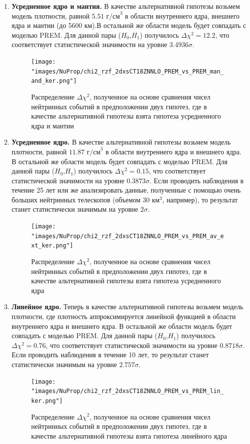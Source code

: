 \begin{enumerate}
    \item \textbf{Усредненное ядро и мантия.} В качестве альтернативной гипотезы возьмем модель плотности, равной $5.51\text{ г/см}^3$ в области внутреннего ядра, внешнего ядра и мантии (до 5600 км).В остальной же области модель будет совпадать с моделью PREM. Для данной пары ($H_0$,$H_1$) получилось $\Delta\chi^2 = 12.2$, что соответствует статистической значимости на уровне $3.4936\sigma$.   
    \begin{figure}[!h]
    \centering
    \texttt{[image: "images/NuProp/chi2\_rzf\_2dxsCT18ZNNLO\_PREM\_vs\_PREM\_man\_and\_ker.png"]}
    \caption{Распределение $\Delta\chi^2$, полученное на основе сравнения чисел нейтринных событий в предположении двух гипотез, где в качестве альтернативной гипотезы взята гипотеза усредненного ядра и мантии}
    \label{NuTom1}
    \end{figure}
    \item \textbf{Усредненное ядро.} В качестве альтернативной гипотезы возьмем модель плотности, равной $11.87\text{ г/см}^3$ в области внутреннего ядра и внешнего ядра. В остальной же области модель будет совпадать с моделью PREM. Для данной пары ($H_0$,$H_1$) получилось $\Delta\chi^2 = 0.15$, что соответствует статистической значимости на уровне $0.3873\sigma$. Если проводить наблюдения в течение 25 лет или же анализировать данные, полученные с помощью очень больших нейтринных телескопов (объемом $30 \text{ км}^3$, например), то результат станет статистически значимым на уровне $2\sigma$.   
    \begin{figure}[!h]
    \centering
    \texttt{[image: "images/NuProp/chi2\_rzf\_2dxsCT18ZNNLO\_PREM\_vs\_PREM\_av\_ext\_ker.png"]}
    \caption{Распределение $\Delta\chi^2$, полученное на основе сравнения чисел нейтринных событий в предположении двух гипотез, где в качестве альтернативной гипотезы взята гипотеза усредненного ядра}
    \label{NuTom2}
    \end{figure}
    \item \textbf{Линейное ядро.} Теперь в качестве альтернативной гипотезы возьмем модель плотности,  где плотность аппроксимируется линейной функцией в области внутреннего ядра и внешнего ядра. В остальной же области модель будет совпадать с моделью PREM. Для данной пары ($H_0$,$H_1$) получилось $\Delta\chi^2 = 0.76$, что соответствует статистической значимости на уровне $0.8718\sigma$. Если проводить наблюдения в течение 10 лет, то результат станет статистически значимым на уровне $2.757\sigma$. 
    \begin{figure}[!h]
    \centering
    \texttt{[image: "images/NuProp/chi2\_rzf\_2dxsCT18ZNNLO\_PREM\_vs\_PREM\_lin\_ker.png"]}
    \caption{Распределение $\Delta\chi^2$, полученное на основе сравнения чисел нейтринных событий в предположении двух гипотез, где в качестве альтернативной гипотезы взята гипотеза линейного ядра}
    \label{NuTom3}
    \end{figure}
\end{enumerate}
